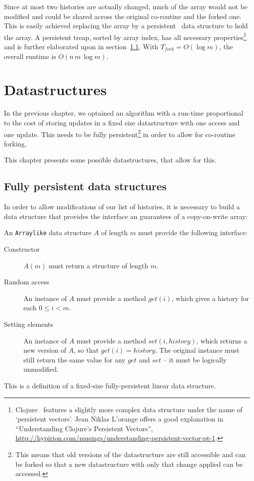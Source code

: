 \documentclass[11pt]{Thesis}
\theoremstyle{definition}
\newcommand{\Secref}[1]{section~\ref{sec:#1}}
\newcommand{\seclabel}[1]{\label{sec:#1}}
\begin{document}
Since at most two histories are actually changed, much of the 
array would not be modified and could be shared across the original
co-routine and the forked one. This is easily achieved replacing the
array by a persistent~\cite{Dris89a} data structure to hold the 
array. A persistent treap, sorted by array index, has all necessary
properties\footnote{Clojure~\cite{Hick08} features a slightly more complex data
structure under the name of `persistent vectors'. Jean Niklas L'orange offers a
good explanation in ``Understanding Clojure's Persistent Vectors'',
\url{http://hypirion.com/musings/understanding-persistent-vector-pt-1}.} and
is further elaborated upon in \Secref{treap}. With $T_{fork}=O(\log m)$,
the overall runtime is $O(n\,m\,\log m)$.

\chapter{Datastructures}\label{cha:data}
In the previous chapter, we optained an algorithm with a run-time 
proportional to the cost of storing updates in a fixed size datastructure 
with one access and one update. This needs to be fully 
persistent\footnote{This means that old versions of the datastructure are 
  still accessible and can be forked so that a new datastructure with only 
that change applied can be accessed.} in order to allow for co-routine forking.

This chapter presents some possible datastructures, that allow for this.

\section{Fully persistent data structures}	\seclabel{treap}\seclabel{data-structures}
In order to allow modifications of our list of histories, it is
necessary to build a data structure that provides the interface an guarantees 
of a copy-on-write array:

\begin{definition}
  An \texttt{Arraylike} data structure $A$ of length $m$ must provide the 
  following interface:
  \begin{description}
    \item[Constructor] $A(m)$ must return a structure of length $m$.
    \item[Random access] An instance of $A$ must provide a method $get(i)$,
      which gives a history for each $0 \leq i < m$.
    \item[Setting elements] An instance of $A$ must provide a method $set(i,
      history)$, which returns a new version of $A$, so that $get(i) = history$.
      The original instance must still return the same value for any $get$ 
      and $set$ -- it must be logically unmodified.
  \end{description}

  This is a definition of a fixed-size fully-persistent linear data structure.
\end{definition}
\end{document}
